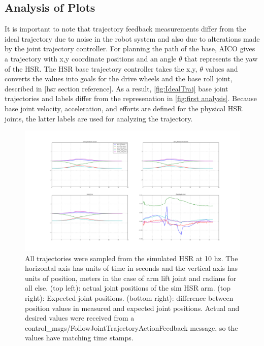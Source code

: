 \documentclass[12pt]{article}
\begin{document}
    \subsection{Analysis of Plots}
        It is important to note that trajectory feedback measurements differ from the ideal trajectory due to noise in the robot system and also due to alterations made by the joint trajectory controller. 
        For planning the path of the base, AICO gives a trajectory with x,y coordinate positions and an angle \(\theta\) that represents the yaw of the HSR. The HSR base trajectory controller takes the x,y, \(\theta\) values and converts the values into goals for the drive wheels and the base roll joint, described in [hsr section reference]. As a result, \autoref{fig:IdealTraj} base joint trajectories and labels differ from the represenation in \autoref{fig:first analysis}. Because base joint velocity, acceleration, and efforts are defined for the physical HSR joints, the latter labels are used for analyzing the trajectory.

        \begin{figure}
            \includegraphics[width=\linewidth]{2020.04.02/positions.png}
            \centering
            \caption{All trajectories were sampled from the simulated HSR at 10 hz. The horizontal axis has units of time in seconds and the vertical axis has units of position, meters in the case of arm lift joint and radians for all else. (top left): actual joint positions of the sim HSR arm. (top right): Expected joint positions. (bottom right): difference between position values in measured and expected joint positions. Actual and desired values were received from a control\_msgs/FollowJointTrajectoryActionFeedback message, so the values have matching time stamps.}
            \label{fig:posAccuracy}
        \end{figure}
\end{document}
